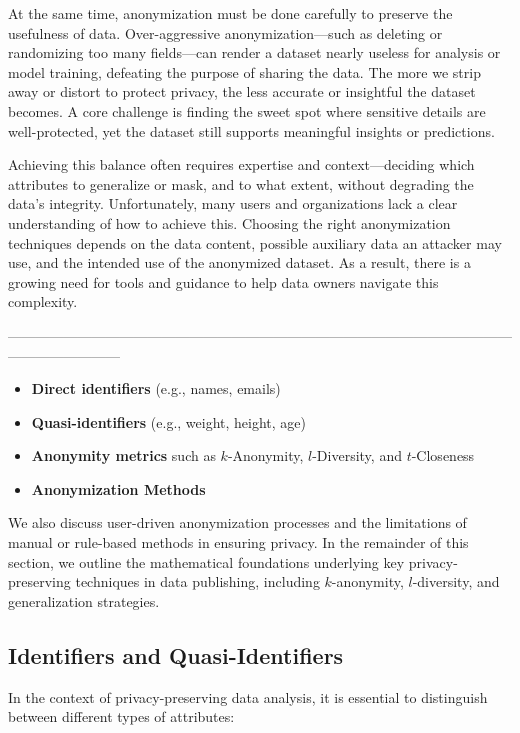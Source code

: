 \documentclass{article}
\begin{document}
At the same time, anonymization must be done carefully to preserve the usefulness of data. Over-aggressive anonymization—such as deleting or randomizing too many fields—can render a dataset nearly useless for analysis or model training, defeating the purpose of sharing the data. The more we strip away or distort to protect privacy, the less accurate or insightful the dataset becomes. A core challenge is finding the sweet spot where sensitive details are well-protected, yet the dataset still supports meaningful insights or predictions.

Achieving this balance often requires expertise and context—deciding which attributes to generalize or mask, and to what extent, without degrading the data’s integrity. Unfortunately, many users and organizations lack a clear understanding of how to achieve this. Choosing the right anonymization techniques depends on the data content, possible auxiliary data an attacker may use, and the intended use of the anonymized dataset. As a result, there is a growing need for tools and guidance to help data owners navigate this complexity.

------------------------------------------------------------------------------------------------------------------------------------

\begin{itemize}
\item \textbf{Direct identifiers} (e.g., names, emails)
\item \textbf{Quasi-identifiers} (e.g., weight, height, age)
\item \textbf{Anonymity metrics} such as $k$-Anonymity, $l$-Diversity, and $t$-Closeness
\item \textbf{Anonymization Methods}
\end{itemize}

We also discuss user-driven anonymization processes and the limitations of manual or rule-based methods in ensuring privacy. In the remainder of this section, we outline the mathematical foundations underlying key privacy-preserving techniques in data publishing, including $k$-anonymity, $l$-diversity, and generalization strategies.

\subsection{Identifiers and Quasi-Identifiers}

In the context of privacy-preserving data analysis, it is essential to distinguish between different types of attributes:
\end{document}
